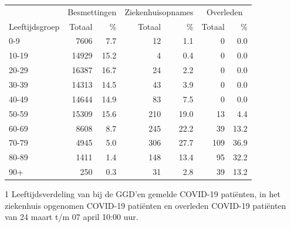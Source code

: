 \documentclass[
  english,
  man,floatsintext]{apa6}
\begin{document}
\begin{table}
\centering\begingroup\fontsize{11}{13}\selectfont

\begin{threeparttable}
\begin{tabular}{lrrrrrr}
\toprule
\multicolumn{1}{c}{ } & \multicolumn{2}{c}{Besmettingen} & \multicolumn{2}{c}{Ziekenhuisopnames} & \multicolumn{2}{c}{Overleden} \\
\cmidrule(l{3pt}r{3pt}){2-3} \cmidrule(l{3pt}r{3pt}){4-5} \cmidrule(l{3pt}r{3pt}){6-7}
Leeftijdsgroep & Totaal & \% & Totaal & \% & Totaal & \%\\
\midrule
0-9 & 7606 & 7.7 & 12 & 1.1 & 0 & 0.0\\
10-19 & 14929 & 15.2 & 4 & 0.4 & 0 & 0.0\\
20-29 & 16387 & 16.7 & 24 & 2.2 & 0 & 0.0\\
30-39 & 14313 & 14.5 & 43 & 3.9 & 0 & 0.0\\
40-49 & 14644 & 14.9 & 83 & 7.5 & 0 & 0.0\\
50-59 & 15309 & 15.6 & 210 & 19.0 & 13 & 4.4\\
60-69 & 8608 & 8.7 & 245 & 22.2 & 39 & 13.2\\
70-79 & 4945 & 5.0 & 306 & 27.7 & 109 & 36.9\\
80-89 & 1411 & 1.4 & 148 & 13.4 & 95 & 32.2\\
90+ & 250 & 0.3 & 31 & 2.8 & 39 & 13.2\\
\bottomrule
\end{tabular}
\begin{tablenotes}
\item[1] Leeftijdsverdeling van bij de GGD’en gemelde COVID-19 patiënten, in het ziekenhuis opgenomen COVID-19 patiënten en overleden COVID-19 patiënten van 24 maart t/m 07 april 10:00 uur.
\end{tablenotes}
\end{threeparttable}
\endgroup{}
\end{table}

\newpage
\end{document}
